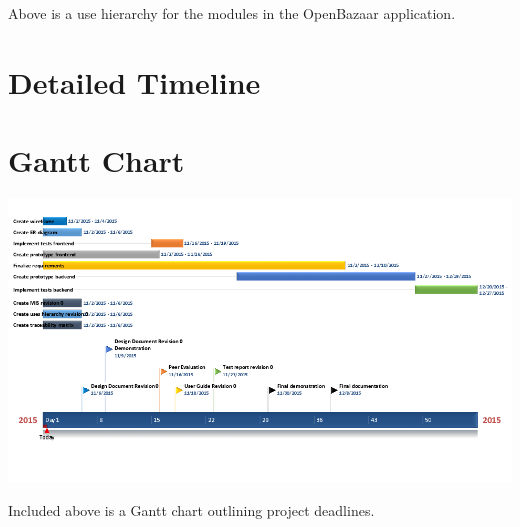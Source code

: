 \documentclass{article}
\begin{document}
Above is a use hierarchy for the modules in the OpenBazaar application.
\section*{Detailed Timeline}

\section*{Gantt Chart}
\includegraphics[scale=0.5]{gantt_chart}

Included above is a Gantt chart outlining project deadlines.
\end{document}
